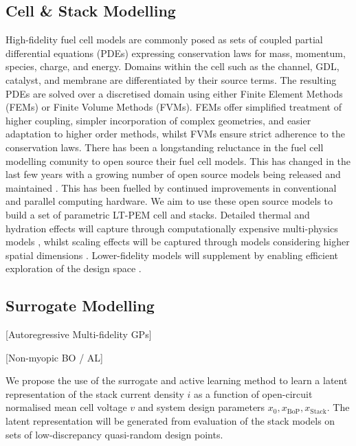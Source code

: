 \subsection{Cell \& Stack Modelling}
High-fidelity fuel cell models are commonly posed as sets of coupled partial differential equations (PDEs) expressing conservation laws for mass, momentum, species, charge, and energy.
Domains within the cell such as the channel, GDL, catalyst, and membrane are differentiated by their source terms. The resulting PDEs are solved over a discretised domain using either Finite Element Methods (FEMs) or Finite Volume Methods (FVMs).
FEMs offer simplified treatment of higher coupling, simpler incorporation of complex geometries, and easier adaptation to higher order methods, whilst FVMs ensure strict adherence to the conservation laws.
There has been a longstanding reluctance in the fuel cell modelling comunity to open source their fuel cell models.
This has changed in the last few years with a growing number of open source models being released and maintained \cite{vetterFreeOpenReference2019, secanellOpenFCSTOpenSourceMathematical2014, zhangOpenFuelCell2NewComputational2024,  koneOpenSourceToolboxPEM2018, gassAlphaPEMOpensourceDynamic2025}.
This has been fuelled by continued improvements in conventional and parallel computing hardware.
We aim to use these open source models to build a set of parametric LT-PEM cell and stacks.
Detailed thermal and hydration effects will capture through computationally expensive multi-physics models \cite{secanellOpenFCSTOpenSourceMathematical2014, zhangOpenFuelCell2NewComputational2024, vetterFreeOpenReference2019}, whilst scaling effects will be captured through models considering higher spatial dimensions \cite{secanellOpenFCSTOpenSourceMathematical2014, zhangOpenFuelCell2NewComputational2024, koneOpenSourceToolboxPEM2018a}.
Lower-fidelity models will supplement by enabling efficient exploration of the design space \cite{kulikovskyPhysicallyBasedAnalytical2013a, ohayreFuelCellFundamentals2016, larminieFuelCellSystems2003}.

\subsection{Surrogate Modelling}

[Autoregressive Multi-fidelity GPs]

[Non-myopic BO / AL]

We propose the use of the surrogate and active learning method to learn a latent representation of the stack current density $i$ as a function of open-circuit normalised mean cell voltage $v$ and system design parameters $x_0, x_{\text{BoP}}, x_{\text{Stack}}$.
The latent representation will be generated from evaluation of the stack models on sets of low-discrepancy quasi-random design points.

